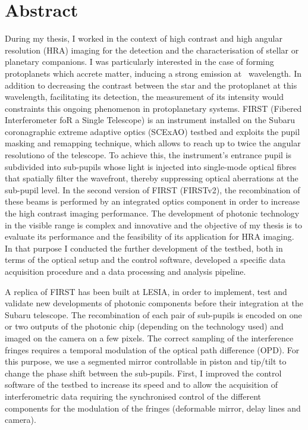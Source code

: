 
\clearpage
\section*{Abstract}

During my thesis, I worked in the context of high contrast and high angular resolution (HRA) imaging for the detection and the characterisation of stellar or planetary companions. I was particularly interested in the case of forming protoplanets which accrete matter, inducing a strong emission at \ha~wavelength. In addition to decreasing the contrast between the star and the protoplanet at this wavelength, facilitating its detection, the measurement of its intensity would constraints this ongoing phenomenon in protoplanetary systems. FIRST (Fibered Interferometer foR a Single Telescope) is an instrument installed on the Subaru coronagraphic extreme adaptive optics (SCExAO) testbed and exploits the pupil masking and remapping technique, which allows to reach up to twice the angular resolutiono of the telescope. To achieve this, the instrument's entrance pupil is subdivided into sub-pupils whose light is injected into single-mode optical fibres that spatially filter the wavefront, thereby suppressing optical aberrations at the sub-pupil level. In the second version of FIRST (FIRSTv2), the recombination of these beams is performed by an integrated optics component in order to increase the high contrast imaging performance. The development of photonic technology in the visible range is complex and innovative and the objective of my thesis is to evaluate its performance and the feasibility of its application for HRA imaging. In that purpose I conducted the further development of the testbed, both in terms of the optical setup and the control software, developed a specific data acquisition procedure and a data processing and analysis pipeline.

A replica of FIRST has been built at LESIA, in order to implement, test and validate new developments of photonic components before their integration at the Subaru telescope. The recombination of each pair of sub-pupils is encoded on one or two outputs of the photonic chip (depending on the technology used) and imaged on the camera on a few pixels. The correct sampling of the interference fringes requires a temporal modulation of the optical path difference (OPD). For this purpose, we use a segmented mirror controllable in piston and tip/tilt to change the phase shift between the sub-pupils. First, I improved the control software of the testbed to increase its speed and to allow the acquisition of interferometric data requiring the synchronised control of the different components for the modulation of the fringes (deformable mirror, delay lines and camera).

